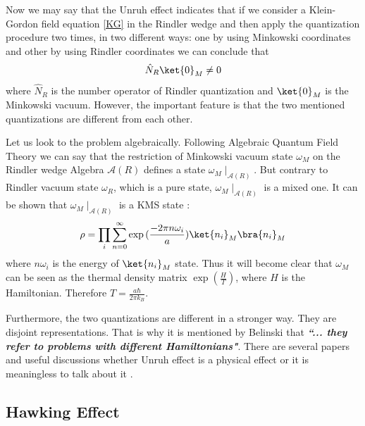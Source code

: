 \documentclass[12pt,a4paper]{article}
\begin{document}
Now we may say that the Unruh effect indicates that if we consider a Klein-Gordon field equation \ref{KG}
 in the Rindler wedge and then apply the quantization procedure two times, in two different ways: one by using Minkowski coordinates and other by using Rindler coordinates we can conclude that 
\begin{equation}
\hat{N}_R\ket{0}_M\neq 0
\end{equation}
 where $\hat{N}_R$ is the number operator of Rindler quantization and $\ket{0}_M$ is the Minkowski vacuum. However, the important feature is that the two mentioned quantizations are different from each other. 

Let us look to the problem algebraically. Following Algebraic Quantum Field Theory we can say that the restriction of Minkowski vacuum state $\omega_M$ on the Rindler wedge Algebra $\mathcal{A}(R)$ defines a state $\omega_{M}\mid _{\mathcal{A}(R)}$. But contrary to Rindler vacuum state $\omega_R$, which is a pure state, $\omega_{M}\mid _{\mathcal{A}(R)}$ is a mixed one.
 It can be shown that  $\omega_{M}\mid _{\mathcal{A}(R)}$ is a KMS state \cite{Wald}:
\begin{equation}
      \rho=\prod_i \sum_{n=0}^{\infty} \exp{(\frac{-2\pi n \omega_i}{a})}\ket{n_i}_M\bra{n_i}_M
\end{equation} 
where $n\omega_i$ is the energy of $\ket{n_i}_M$ state. Thus it will become clear that $\omega_M$ can be seen as the thermal density matrix $\exp (\frac{H}{T})$, where $H$ is the Hamiltonian. Therefore  $T=\frac{a \hbar}{2\pi k_B }$.

Furthermore, the two quantizations are different in a stronger way. They are disjoint representations. That is why it is mentioned by Belinski \cite{Belinski} that \emph{\textbf{``... they refer to problems with different Hamiltonians"}}. There are several papers and useful discussions whether Unruh effect is a physical effect or it is meaningless to talk about it  \cite{Arageorgis} \cite{Belinski} \cite{Halvorson}.

\subsection{Hawking Effect}\label{section.hawking Effect}
\end{document}

